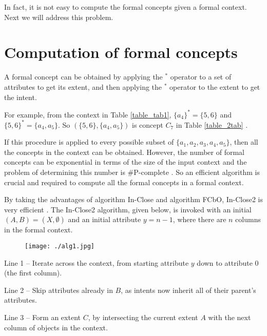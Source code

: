 \documentclass[11pt]{article}
\numberwithin{equation}{subsection}
\begin{document}

In fact, it is not easy to compute the formal concepts given a formal context. Next we will address this problem.

\section{Computation of formal concepts} \label{s2}



A formal concept can be obtained by applying the $^*$ operator to a set of attributes to get its extent, and then applying the $^*$ operator to the extent to get the intent.

For example,  from the context in  Table \ref{table_tab1},  $\{a_4\}^*= \{5,6\}$ and $\{5,6\}^*=\{a_4,a_5\}$. So $(\{5,6\}, \{a_4,a_5\})$ is concept $C_7$ in  Table \ref{table_2tab} .

If this procedure is applied to every possible subset of $\{a_1, a_2, a_3 ,a_4, a_5\}$, then all the concepts in the context can be obtained. However, the number of formal concepts can be exponential in terms of the size of the input context and the problem of determining this number is \#P-complete \cite{ Kuznetsov01}. So an efficient algorithm is crucial and required to compute all the formal concepts in a formal context.

By taking the advantages of algorithm In-Close and algorithm FCbO, In-Close2 is very efficient \cite{Andrews11,Andrews}.
The In-Close2 algorithm, given below, is invoked with an initial $(A,B)=(X,\emptyset)$ and an initial attribute $y=n-1$, where there are $n$ columns in the formal context.


    \begin{figure}[htp] \centering
        \texttt{[image: ./alg1.jpg]}
        \label{figInClose2}
    \end{figure}

\newpage

Line 1 -- Iterate across the context, from starting attribute $y$ down to attribute 0 (the first column).

Line 2 -- Skip attributes already in $B$, as intents now inherit all of their parent’s attributes.

Line 3 -- Form an extent $C$, by intersecting the current extent $A$ with the next column of objects in the context.
\end{document}
